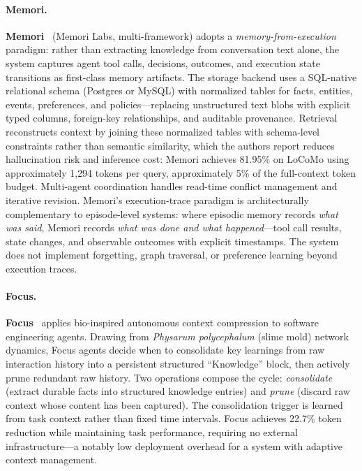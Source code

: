 \paragraph{Memori.}
\textbf{Memori}~\cite{memori2026} (Memori Labs, multi-framework) adopts
a \emph{memory-from-execution} paradigm: rather than extracting
knowledge from conversation text alone, the system captures agent tool
calls, decisions, outcomes, and execution state transitions as
first-class memory artifacts.  The storage backend uses a SQL-native
relational schema (Postgres or MySQL) with normalized tables for facts,
entities, events, preferences, and policies---replacing unstructured
text blobs with explicit typed columns, foreign-key relationships, and
auditable provenance.  Retrieval reconstructs context by joining these
normalized tables with schema-level constraints rather than semantic
similarity, which the authors report reduces hallucination risk and
inference cost: Memori achieves 81.95\% on LoCoMo using approximately
1{,}294 tokens per query, approximately 5\% of the full-context token
budget.  Multi-agent coordination handles read-time conflict management
and iterative revision.  Memori's execution-trace paradigm is
architecturally complementary to episode-level systems: where episodic
memory records \emph{what was said}, Memori records \emph{what was done
and what happened}---tool call results, state changes, and observable
outcomes with explicit timestamps.  The system does not implement
forgetting, graph traversal, or preference learning beyond execution
traces.

\paragraph{Focus.}
\textbf{Focus}~\cite{focus2026} applies bio-inspired autonomous context
compression to software engineering agents.  Drawing from
\emph{Physarum polycephalum} (slime mold) network dynamics, Focus
agents decide when to consolidate key learnings from raw interaction
history into a persistent structured ``Knowledge'' block, then
actively prune redundant raw history.  Two operations compose the
cycle: \emph{consolidate} (extract durable facts into structured
knowledge entries) and \emph{prune} (discard raw context whose content
has been captured).  The consolidation trigger is learned from task
context rather than fixed time intervals.  Focus achieves 22.7\%
token reduction while maintaining task performance, requiring no
external infrastructure---a notably low deployment overhead for
a system with adaptive context management.

